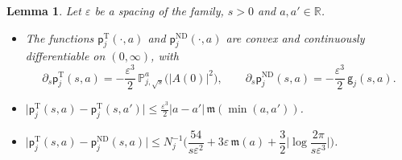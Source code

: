 \documentclass[11pt]{amsart}
\theoremstyle{plain}
\newtheorem{lemma}[theorem]{Lemma}
\theoremstyle{definition}
\theoremstyle{remark}
\numberwithin{equation}{section}
\newcommand{\R}{\mathbb{R}}
\newcommand{\eps}{\varepsilon}
\newcommand{\abs}[1]{\lvert #1\rvert}
\begin{document}
\begin{lemma}\label{lem:pressure}
Let $\eps$ be a spacing of the family, $s>0$ and $a,a'\in\R$.
\begin{itemize}
\item[(a)] The functions $\mathsf p^{\mathrm T}_j(\cdot,a)$ and $\mathsf p^{\mathrm{ND}}_j(\cdot,a)$ are convex and continuously differentiable on $(0,\infty)$, with
\[
\partial_s\mathsf p^{\mathrm T}_j(s,a)=-\frac{\eps^3}2\,\mathbb P^a_{j,\sqrt s}\big(\abs{A(0)}^2\big),\qquad\partial_s\mathsf p^{\mathrm{ND}}_j(s,a)=-\frac{\eps^3}2\,\mathsf g_j(s,a).
\]
\item[(b)] $\abs{\mathsf p^{\mathrm T}_j(s,a)-\mathsf p^{\mathrm T}_j(s,a')}\le\frac{\eps^3}2\abs{a-a'}\,\mathfrak m(\min(a,a'))$.
\item[(c)] $\abs{\mathsf p^{\mathrm T}_j(s,a)-\mathsf p^{\mathrm{ND}}_j(s,a)}\le N_j^{-1}\Big(\dfrac{54}{s\eps^2}+3\eps\,\mathfrak m(a)+\dfrac32\Big|\log\dfrac{2\pi}{s\eps^3}\Big|\Big)$.
\end{itemize}
\end{lemma}
\end{document}
